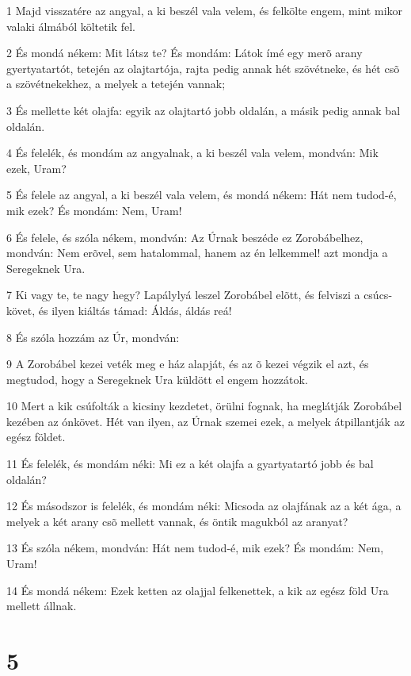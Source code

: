 \par 1 Majd visszatére az angyal, a ki beszél vala velem, és felkölte engem, mint mikor valaki álmából költetik fel.
\par 2 És mondá nékem: Mit látsz te? És mondám: Látok ímé egy merõ arany gyertyatartót, tetején az olajtartója, rajta pedig annak hét szövétneke, és hét csõ a szövétnekekhez, a melyek a tetején vannak;
\par 3 És mellette két olajfa: egyik az olajtartó jobb oldalán, a másik pedig annak bal oldalán.
\par 4 És felelék, és mondám az angyalnak, a ki beszél vala velem, mondván: Mik ezek, Uram?
\par 5 És felele az angyal, a ki beszél vala velem, és mondá nékem: Hát nem tudod-é, mik ezek? És mondám: Nem, Uram!
\par 6 És felele, és szóla nékem, mondván: Az Úrnak beszéde ez Zorobábelhez, mondván: Nem erõvel, sem hatalommal, hanem az én lelkemmel! azt mondja a Seregeknek Ura.
\par 7 Ki vagy te, te nagy hegy? Lapálylyá leszel Zorobábel elõtt, és felviszi a csúcs-követ, és ilyen kiáltás támad: Áldás, áldás reá!
\par 8 És szóla hozzám az Úr, mondván:
\par 9 A Zorobábel kezei veték meg e ház alapját, és az õ kezei végzik el azt, és megtudod, hogy a Seregeknek Ura küldött el engem hozzátok.
\par 10 Mert a kik csúfolták a kicsiny kezdetet, örülni fognak, ha meglátják Zorobábel kezében az ónkövet. Hét van ilyen,  az Úrnak szemei ezek, a melyek átpillantják az egész földet.
\par 11 És felelék, és mondám néki: Mi ez a két olajfa a gyartyatartó jobb és bal oldalán?
\par 12 És másodszor is felelék, és mondám néki: Micsoda az olajfának az a két ága, a melyek a két arany csõ mellett vannak, és öntik magukból az aranyat?
\par 13 És szóla nékem, mondván: Hát nem tudod-é, mik ezek? És mondám: Nem, Uram!
\par 14 És mondá nékem: Ezek ketten az olajjal felkenettek, a kik az egész föld Ura mellett állnak.

\chapter{5}

